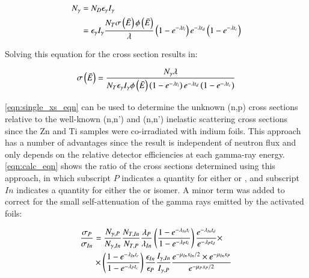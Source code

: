  

\begin{align}
N_{\gamma} &= N_D \epsilon_\gamma I_\gamma \\
&=  \epsilon_\gamma I_\gamma  \dfrac{N_T \sigma\left( \bar{E}\right) \phi\left( \bar{E}\right) }{\lambda}\left( 1 - e^{-\lambda t_i}\right)  e^{-\lambda t_d} \left( 1 - e^{-\lambda t_c}\right) \nonumber
\end{align}

Solving this equation for the  cross section results in:

\begin{align}\label{eqn:single_xs_eqn}
\sigma\pp{\bar{E}} = \dfrac{N_{\gamma}\lambda}{N_T \epsilon_\gamma I_\gamma  \phi\pp{\bar{E}}  \pp{1 - e^{-\lambda t_i}} e^{-\lambda t_d} \pp{1 - e^{-\lambda t_c}}}
\end{align}


\autoref{eqn:single_xs_eqn} can be used to determine the unknown (n,p) cross sections relative to the well-known (n,n') and (n,n') inelastic scattering cross sections since the Zn and Ti samples were co-irradiated with indium foils.
This approach has a number of advantages since the result is independent of neutron flux and only depends on the relative detector efficiencies at each gamma-ray energy.
 \autoref{eqn:calc_eqn} shows the ratio of the cross sections determined using this approach, in which subscript $P$ indicates a quantity for either  or , and subscript $In$ indicates a quantity for either the  or  isomer.
A minor term was added to correct for the small self-attenuation of the gamma rays emitted by the activated foils:



\begin{align}\label{eqn:calc_eqn}
\dfrac{\sigma_P}{\sigma_{In}} &=  \dfrac{N_{\gamma,P}}{N_{\gamma,In}}  \dfrac{N_{T,In}}{N_{T,P}} \dfrac{\lambda_P}{\lambda_{In}} \pp{\dfrac{1 - e^{-\lambda_{In}t_i}}{1 - e^{-\lambda_{P}t_i}}} \dfrac{e^{-\lambda_{In}t_d}}{ e^{-\lambda_{P}t_d}} \times \\
&\times \pp{\dfrac{1 - e^{-\lambda_{In}t_c}}{1 - e^{-\lambda_{P}t_c}}} \dfrac{\epsilon_{In}}{\epsilon_P}  \dfrac{I_{\gamma,In}}{I_{\gamma,P}} \dfrac{e^{-\mu_{In}x_{In}/2}\times e^{-\mu_{In}x_{P}}}{e^{-\mu_{P}x_{P}/2}} \nonumber
\end{align}

